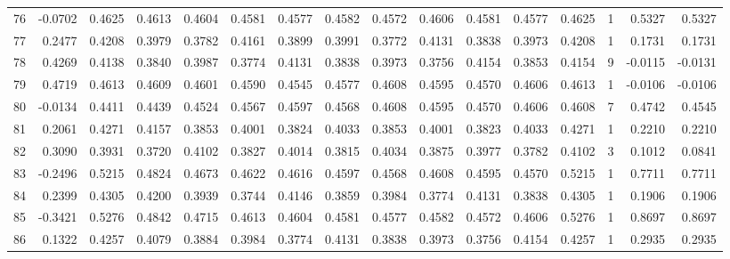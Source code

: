 \begin{tabular}{lrrrrrrrrrrrrrrr}
76  &     -0.0702 &  0.4625 &  0.4613 &  0.4604 &  0.4581 &  0.4577 &  0.4582 &  0.4572 &  0.4606 &  0.4581 &   0.4577 &     0.4625 &      1 &                    0.5327 &                     0.5327 \\
77  &      0.2477 &  0.4208 &  0.3979 &  0.3782 &  0.4161 &  0.3899 &  0.3991 &  0.3772 &  0.4131 &  0.3838 &   0.3973 &     0.4208 &      1 &                    0.1731 &                     0.1731 \\
78  &      0.4269 &  0.4138 &  0.3840 &  0.3987 &  0.3774 &  0.4131 &  0.3838 &  0.3973 &  0.3756 &  0.4154 &   0.3853 &     0.4154 &      9 &                   -0.0115 &                    -0.0131 \\
79  &      0.4719 &  0.4613 &  0.4609 &  0.4601 &  0.4590 &  0.4545 &  0.4577 &  0.4608 &  0.4595 &  0.4570 &   0.4606 &     0.4613 &      1 &                   -0.0106 &                    -0.0106 \\
80  &     -0.0134 &  0.4411 &  0.4439 &  0.4524 &  0.4567 &  0.4597 &  0.4568 &  0.4608 &  0.4595 &  0.4570 &   0.4606 &     0.4608 &      7 &                    0.4742 &                     0.4545 \\
81  &      0.2061 &  0.4271 &  0.4157 &  0.3853 &  0.4001 &  0.3824 &  0.4033 &  0.3853 &  0.4001 &  0.3823 &   0.4033 &     0.4271 &      1 &                    0.2210 &                     0.2210 \\
82  &      0.3090 &  0.3931 &  0.3720 &  0.4102 &  0.3827 &  0.4014 &  0.3815 &  0.4034 &  0.3875 &  0.3977 &   0.3782 &     0.4102 &      3 &                    0.1012 &                     0.0841 \\
83  &     -0.2496 &  0.5215 &  0.4824 &  0.4673 &  0.4622 &  0.4616 &  0.4597 &  0.4568 &  0.4608 &  0.4595 &   0.4570 &     0.5215 &      1 &                    0.7711 &                     0.7711 \\
84  &      0.2399 &  0.4305 &  0.4200 &  0.3939 &  0.3744 &  0.4146 &  0.3859 &  0.3984 &  0.3774 &  0.4131 &   0.3838 &     0.4305 &      1 &                    0.1906 &                     0.1906 \\
85  &     -0.3421 &  0.5276 &  0.4842 &  0.4715 &  0.4613 &  0.4604 &  0.4581 &  0.4577 &  0.4582 &  0.4572 &   0.4606 &     0.5276 &      1 &                    0.8697 &                     0.8697 \\
86  &      0.1322 &  0.4257 &  0.4079 &  0.3884 &  0.3984 &  0.3774 &  0.4131 &  0.3838 &  0.3973 &  0.3756 &   0.4154 &     0.4257 &      1 &                    0.2935 &                     0.2935 \\

\end{tabular}
